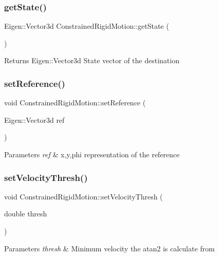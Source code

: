 \subsubsection{\texorpdfstring{get\+State()}{getState()}}
{\footnotesize\ttfamily Eigen\+::\+Vector3d Constrained\+Rigid\+Motion\+::get\+State (\begin{DoxyParamCaption}{ }\end{DoxyParamCaption})}

\begin{DoxyReturn}{Returns}
Eigen\+::\+Vector3d State vector of the destination 
\end{DoxyReturn}
\mbox{\label{group__RigidMotion_gac71f6e395c1d63f54cfb837b5526236b}} 
\subsubsection{\texorpdfstring{set\+Reference()}{setReference()}}
{\footnotesize\ttfamily void Constrained\+Rigid\+Motion\+::set\+Reference (\begin{DoxyParamCaption}\item[{Eigen\+::\+Vector3d}]{ref }\end{DoxyParamCaption})}


\begin{DoxyParams}{Parameters}
{\em ref} & x,y,phi representation of the reference \\
\hline
\end{DoxyParams}
\mbox{\label{group__RigidMotion_ga70771b8bb17cff0ffceadae49eab9f8e}} 
\subsubsection{\texorpdfstring{set\+Velocity\+Thresh()}{setVelocityThresh()}}
{\footnotesize\ttfamily void Constrained\+Rigid\+Motion\+::set\+Velocity\+Thresh (\begin{DoxyParamCaption}\item[{double}]{thresh }\end{DoxyParamCaption})}


\begin{DoxyParams}{Parameters}
{\em thresh} & Minimum velocity the atan2 is calculate from \\
\hline
\end{DoxyParams}
\mbox{\label{group__RigidMotion_ga80649fcba3aed41550ba463f405d051b}} 
